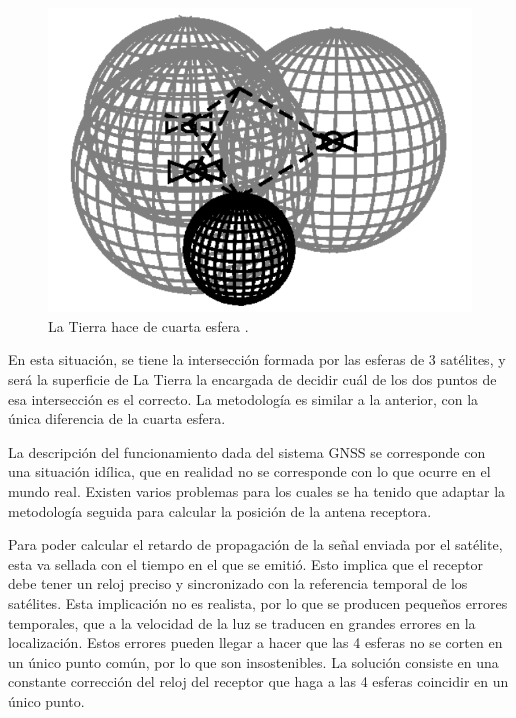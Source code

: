 \begin{figure}
	\centering
	\includegraphics[width=1\textwidth]{imagenes/tierra4esfera.PNG}
	\caption{\label{fig1}La Tierra hace de cuarta esfera \cite{gnss}.}
\end{figure}

En esta situación, se tiene la intersección formada por las esferas de 3 satélites, y será la superficie de La Tierra la encargada de decidir cuál de los dos puntos de esa intersección es el correcto. La metodología es similar a la anterior, con la única diferencia de la cuarta esfera. \newline

La descripción del funcionamiento dada del sistema GNSS se corresponde con una situación idílica, que en realidad no se corresponde con lo que ocurre en el mundo real. Existen varios problemas para los cuales se ha tenido que adaptar la metodología seguida para calcular la posición de la antena receptora. \newline

Para poder calcular el retardo de propagación de la señal enviada por el satélite, esta va sellada con el tiempo en el que se emitió. Esto implica que el receptor debe tener un reloj preciso y sincronizado con la referencia temporal de los satélites. Esta implicación no es realista, por lo que se producen pequeños errores temporales, que a la velocidad de la luz se traducen en grandes errores en la localización. Estos errores pueden llegar a hacer que las 4 esferas no se corten en un único punto común, por lo que son insostenibles. La solución consiste en una constante corrección del reloj del receptor que haga a las 4 esferas coincidir en un único punto. \newline

